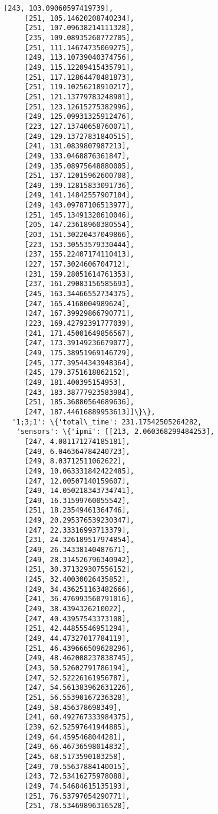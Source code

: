 \documentclass[11pt]{article}
\begin{document}
\begin{tcolorbox}[breakable, size=fbox, boxrule=.5pt, pad at break*=1mm, opacityfill=0]
\begin{Verbatim}[commandchars=\\\{\}]
     [243, 103.09060597419739],
     [251, 105.14620208740234],
     [251, 107.09638214111328],
     [235, 109.08935260772705],
     [251, 111.14674735069275],
     [249, 113.10739040374756],
     [249, 115.12209415435791],
     [251, 117.12864470481873],
     [251, 119.10256218910217],
     [251, 121.13779783248901],
     [251, 123.12615275382996],
     [249, 125.09931325912476],
     [223, 127.13740658760071],
     [249, 129.13727831840515],
     [241, 131.0839807987213],
     [249, 133.0468876361847],
     [249, 135.08975648880005],
     [251, 137.12015962600708],
     [249, 139.12815833091736],
     [249, 141.14842557907104],
     [249, 143.09787106513977],
     [251, 145.13491320610046],
     [205, 147.23618960380554],
     [203, 151.30220437049866],
     [223, 153.30553579330444],
     [237, 155.22407174110413],
     [227, 157.3024606704712],
     [231, 159.28051614761353],
     [237, 161.29083156585693],
     [245, 163.34466552734375],
     [247, 165.4168004989624],
     [247, 167.39929866790771],
     [223, 169.42792391777039],
     [241, 171.45001649856567],
     [247, 173.39149236679077],
     [249, 175.38951969146729],
     [245, 177.39544343948364],
     [245, 179.3751618862152],
     [249, 181.400395154953],
     [243, 183.38777923583984],
     [251, 185.36880564689636],
     [247, 187.44616889953613]]\}\},
  '1;3;1': \{'total\_time': 231.17542505264282,
   'sensors': \{'ipmi': [[213, 2.060368299484253],
     [247, 4.081171274185181],
     [249, 6.046364784240723],
     [249, 8.03712511062622],
     [249, 10.063331842422485],
     [247, 12.00507140159607],
     [249, 14.050218343734741],
     [249, 16.31599760055542],
     [251, 18.23549461364746],
     [249, 20.295376539230347],
     [247, 22.33316993713379],
     [231, 24.326189517974854],
     [249, 26.34338140487671],
     [249, 28.314526796340942],
     [251, 30.371329307556152],
     [245, 32.40030026435852],
     [249, 34.436251163482666],
     [241, 36.476993560791016],
     [249, 38.4394326210022],
     [247, 40.43957543373108],
     [251, 42.44855546951294],
     [249, 44.47327017784119],
     [251, 46.439666509628296],
     [249, 48.462008237838745],
     [243, 50.52602791786194],
     [247, 52.52226161956787],
     [247, 54.561383962631226],
     [251, 56.55390167236328],
     [249, 58.456378698349],
     [241, 60.492767333984375],
     [239, 62.52597641944885],
     [249, 64.4595468044281],
     [249, 66.46736598014832],
     [245, 68.5173590183258],
     [249, 70.55637884140015],
     [243, 72.53416275978088],
     [249, 74.54684615135193],
     [251, 76.53797054290771],
     [251, 78.53469896316528],

\end{Verbatim}
\end{tcolorbox}
\end{document}
